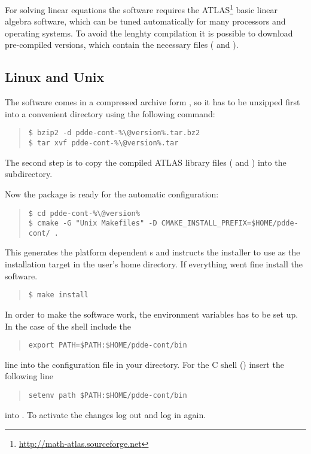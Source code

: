 \documentclass[10pt,a4paper]{ddedoc}
\begin{document}
For solving linear equations the software requires the ATLAS\footnote{\url{http://math-atlas.sourceforge.net}} basic linear algebra software, which can be tuned automatically for many processors and operating systems. To avoid the lenghty compilation it is possible to download pre-compiled versions, which contain the necessary files ( and ).

\subsection{Linux and Unix}

The software comes in a compressed archive form , so it has to be unzipped first into a convenient directory using the following command:
{ \small \begin{quote} \begin{lstlisting}[basicstyle=\ttfamily,frame=single]
$ bzip2 -d pdde-cont-%\@version%.tar.bz2
$ tar xvf pdde-cont-%\@version%.tar
\end{lstlisting} \end{quote} } \noindent
The second step is to copy the compiled ATLAS library files ( and ) into the
 subdirectory.

Now the package is ready for the automatic configuration:
{ \small \begin{quote} \begin{lstlisting}[basicstyle=\tt,frame=single]
$ cd pdde-cont-%\@version%
$ cmake -G "Unix Makefiles" -D CMAKE_INSTALL_PREFIX=$HOME/pdde-cont/ .
\end{lstlisting} \end{quote} } \noindent
This generates the platform dependent s and instructs the installer to use  as the installation target in the user's home directory. If everything went fine install the software.
{ \small \begin{quote} \begin{lstlisting}[basicstyle=\tt,frame=single]
$ make install
\end{lstlisting} \end{quote} } \noindent
In order to make the software work, the  environment variables has to be set up. In the case of the  shell include the
{ \small \begin{quote} \begin{lstlisting}[basicstyle=\tt,frame=single]
export PATH=$PATH:$HOME/pdde-cont/bin
\end{lstlisting} \end{quote} } \noindent
line into the  configuration file in your  directory. For the C shell () insert the following line
{ \small \begin{quote} \begin{lstlisting}[basicstyle=\tt,frame=single]
setenv path $PATH:$HOME/pdde-cont/bin
\end{lstlisting} \end{quote} } \noindent
into . To activate the changes log out and log in again.
\end{document}
